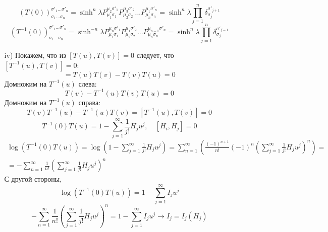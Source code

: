\documentclass[12pt]{article}
\theoremstyle{definition}
\begin{document}
\begin{enumerate}
\begin{itemize}
        \begin{equation}
            \boxed{(T(0))^{\sigma'_1...\sigma'_n}_{\sigma_1...\sigma_n}=\sinh^n\lambda P^{\mu_2\sigma'_1}_{\mu_1\sigma_1}P^{\mu_3\sigma'_2}_{\mu_2\sigma_2}...P^{\mu_1\sigma'_n}_{\mu_n\sigma_n}=\sinh^n\lambda\prod\limits_{j=1}^n\delta_{\sigma_j}^{\sigma'_{j+1}}}
        \end{equation}
        \begin{equation}
            \boxed{(T^{-1}(0))^{\sigma'_1...\sigma'_n}_{\sigma_1...\sigma_n}=\sinh^{-n}\lambda P^{\mu_n\sigma'_1}_{\mu_1\sigma_1}P^{\mu_1\sigma'_2}_{\mu_2\sigma_2}...P^{\mu_{n-1}\sigma'_n}_{\mu_n\sigma_n}=\sinh^n\lambda\prod\limits_{j=1}^n\delta_{\sigma_j}^{\sigma'_{j-1}}}
        \end{equation}
        \item[iv)] Покажем, что из $[T(u),T(v)]=0$ следует, что $[T^{-1}(u),T(v)]=0$:
        \begin{equation}
            [T(u),T(v)]=T(u)T(v)-T(v)T(u)=0
        \end{equation}
        Домножим на $T^{-1}(u)$ слева:
        \begin{equation}
            T(v)-T^{-1}(u)T(v)T(u)=0
        \end{equation}
        Домножим на $T^{-1}(u)$ справа:
        \begin{equation}
            T(v)T^{-1}(u)-T^{-1}(u)T(v)=[T^{-1}(u),T(v)]=0
        \end{equation}
        \begin{equation}
            T^{-1}(0)T(u)=1-\sum\limits_{j=1}^\infty\frac{1}{j!}H_ju^j,\quad [H_i,H_j]=0
        \end{equation}
        \begin{multline}
            \log(T^{-1}(0)T(u))=\log\left(1-\sum\limits_{j=1}^\infty\frac{1}{j!}H_ju^j\right)=\sum\limits_{n=1}^\infty\left(\frac{(-1)^{n+1}}{n!}(-1)^n\left(\sum\limits_{j=1}^\infty\frac{1}{j!}H_ju^j\right)^n\right)=\\=-\sum\limits_{n=1}^\infty\frac{1}{n!}\left(\sum\limits_{j=1}^\infty\frac{1}{j!}H_ju^j\right)^n
        \end{multline}
        С другой стороны,
        \begin{equation}
            \log(T^{-1}(0)T(u))=1-\sum\limits_{j=1}^\infty I_ju^j
        \end{equation}
        \begin{equation}
            -\sum\limits_{n=1}^\infty\frac{1}{n!}\left(\sum\limits_{j=1}^\infty\frac{1}{j!}H_ju^j\right)^n=1-\sum\limits_{j=1}^\infty I_ju^j\rightarrow I_j=I_j(H_j)

\end{equation}
\end{itemize}
\end{enumerate}
\end{document}
